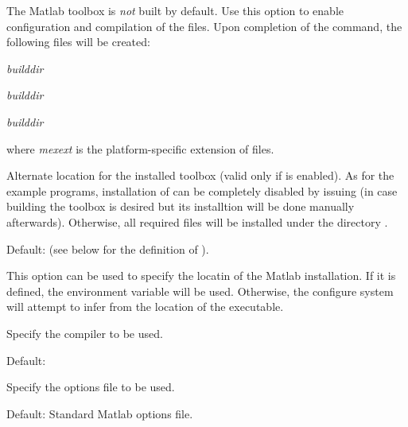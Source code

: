 \begin{config}

\item {}

  The {\sundialsTB} Matlab toolbox is {\em not} built by default. Use this option
  to enable configuration and compilation of the  files. Upon completion
  of the  command, the following  files will be created:
  \begin{config}
    \item {\em builddir}
    \item {\em builddir}
    \item {\em builddir}
  \end{config}
  where {\em mexext} is the platform-specific extension of  files.
  
\item {}

  Alternate location for the installed {\sundialsTB} toolbox (valid only if
  {\sundialsTB} is enabled). As for the example programs, installation of {\sundialsTB} can 
  be completely disabled by issuing  (in case building the toolbox is desired 
  but its installtion will be done manually afterwards). Otherwise, all required {\sundialsTB} 
  files will be installed under the directory .

  Default:   (see below for the definition of ).

\item {}

  This option can be used to specify the locatin of the Matlab installation. 
  If it is defined, the environment variable  will be used. Otherwise,
  the configure system will attempt to infer  from the location of
  the  executable.

\item {}

  Specify the  compiler to be used.

  Default: 

\item {}

  Specify the  options file to be used.

  Default: Standard Matlab  options file.

\end{config}


